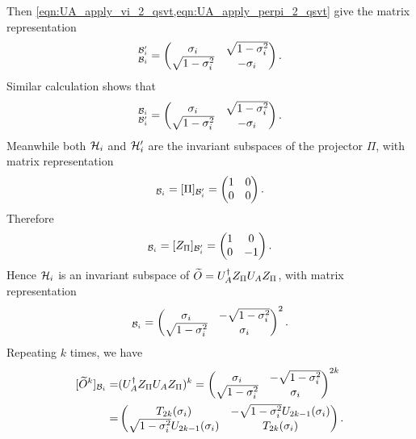 Then \cref{eqn:UA_apply_vi_2_qsvt,eqn:UA_apply_perpi_2_qsvt} give the matrix representation
\begin{equation}
[U_A]_{\mc{B}_i}^{\mc{B}_i'}=\begin{pmatrix}
\sigma_i & \sqrt{1-\sigma_i^2}\\
\sqrt{1-\sigma_i^2} & -\sigma_i
\end{pmatrix}.
\end{equation}
Similar calculation shows that
\begin{equation}
[U^{\dag}_A]_{\mc{B}_i'}^{\mc{B}_i}=\begin{pmatrix}
\sigma_i & \sqrt{1-\sigma_i^2}\\
\sqrt{1-\sigma_i^2} & -\sigma_i
\end{pmatrix}.
\end{equation}
Meanwhile both $\mathcal{H}_i$ and $\mathcal{H}_i'$ are the invariant subspaces of the projector $\Pi$, with matrix representation
\begin{equation}
[\Pi]_{\mc{B}_i}=[\Pi]_{\mc{B}_i'}=\begin{pmatrix}
1 & 0 \\
0 & 0
\end{pmatrix}.
\end{equation}
Therefore
\begin{equation}
[Z_\Pi]_{\mc{B}_i}=[Z_\Pi]_{\mc{B}_i'}=\begin{pmatrix}
1 & 0 \\
0 & -1
\end{pmatrix}.
\end{equation}
Hence $\mathcal{H}_i$ is an invariant subspace of $\widetilde{O}=U_A^{\dag}Z_{\Pi}U_A Z_{\Pi}$, with matrix representation
\begin{equation}
[\wt{O}]_{\mc{B}_i}=\begin{pmatrix}
\sigma_i & -\sqrt{1-\sigma_i^2}\\
\sqrt{1-\sigma_i^2} & \sigma_i
\end{pmatrix}^2.
\end{equation}
Repeating $k$ times, we have
\begin{equation}
\begin{split}
[\widetilde{O}^k]_{\mathcal{B}_i}=&(U_A^{\dag}Z_{\Pi}U_A Z_{\Pi})^{k}=\begin{pmatrix}
\sigma_i & -\sqrt{1-\sigma_i^2}\\
\sqrt{1-\sigma_i^2} & \sigma_i
\end{pmatrix}^{2k}\\
=&\begin{pmatrix}
T_{2k}(\sigma_i) & -\sqrt{1-\sigma_i^2}U_{2k-1}(\sigma_i)\\
\sqrt{1-\sigma_i^2}U_{2k-1}(\sigma_i) & T_{2k}(\sigma_i)
\end{pmatrix}.
\end{split}
\end{equation}
